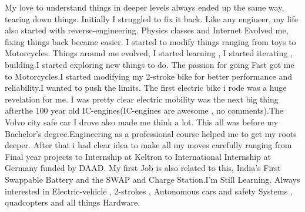 

\begin{cvparagraph}

 My love to understand things in deeper levels always ended up the same way, tearing down things. Initially I struggled to fix it back. Like any engineer, my life also started with reverse-engineering. Physics classes and Internet Evolved me, fixing things back became easier. I started to modify things ranging from toys to Motorcycles. Things around me evolved, I started learning , I started iterating , building.I started exploring new things to do.
The passion for going Fast got me to Motorcycles.I started modifying my 2-stroke bike for better performance and reliability.I wanted to push the limits. The first electric bike i rode was a huge revelation for me. I was pretty clear electric mobility was the next big thing afterthe 100 year old IC-engines(IC-engines are awesome , no comments).The Volvo city safe car I drove also made me think a lot.
This all was before my Bachelor's degree.Engineering as a professional course helped me to get my roots deeper.
After that i had clear idea to make all my moves carefully ranging from Final year projects to Internship at Keltron to International Internship at Germany funded by DAAD. My first Job is also related to this, India's First Swappable Battery and the SWAP and Charge Station.I'm Still Learning.
Always interested in Electric-vehicle , 2-strokes , Autonomous cars and safety Systems , quadcopters and all things Hardware.



\end{cvparagraph}
